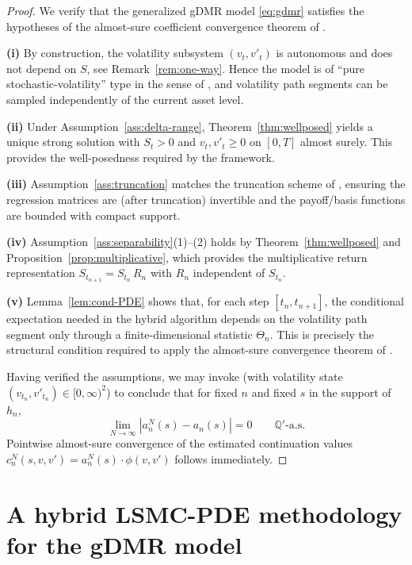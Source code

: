 \documentclass[10pt]{article}
\theoremstyle{plain}
\theoremstyle{definition}
\theoremstyle{remark}
\newcommand{\Q}{\mathbb Q}
\begin{document}
\begin{proof}
We verify that the generalized gDMR model \eqref{eq:gdmr} satisfies the hypotheses of the
almost-sure coefficient convergence theorem of \citet{farahany2020mixing}.

\smallskip
\textbf{(i)}
By construction, the volatility subsystem $(v_t,v'_t)$ is autonomous and does not depend on $S$,
see Remark~\ref{rem:one-way}. Hence the model is of ``pure stochastic-volatility'' type in the sense of
\citet{farahany2020mixing}, and volatility path segments can be sampled independently of the current asset level.

\smallskip
\textbf{(ii)}
Under Assumption~\ref{ass:delta-range}, Theorem~\ref{thm:wellposed} yields a unique strong solution with $S_t>0$
and $v_t,v'_t\ge 0$ on $[0,T]$ almost surely. This provides the well-posedness required by the framework.

\smallskip
\textbf{(iii)}
Assumption~\ref{ass:truncation} matches the truncation scheme of \citet{farahany2020mixing}, ensuring the regression
matrices are (after truncation) invertible and the payoff/basis functions are bounded with compact support.

\smallskip
\textbf{(iv)}
Assumption~\ref{ass:separability}(1)--(2) holds by Theorem~\ref{thm:wellposed} and Proposition~\ref{prop:multiplicative},
which provides the multiplicative return representation
$S_{t_{n+1}} = S_{t_n}\,R_n$ with $R_n$ independent of $S_{t_n}$.

\smallskip
\textbf{(v)}
Lemma~\ref{lem:cond-PDE} shows that, for each step $[t_n,t_{n+1}]$, the conditional expectation needed in the hybrid
algorithm depends on the volatility path segment only through a finite-dimensional statistic $\Theta_n$.
This is precisely the structural condition required to apply the almost-sure convergence theorem of
\citet{farahany2020mixing}.

\smallskip
Having verified the assumptions, we may invoke \citet[Theorem~1]{farahany2020mixing} (with volatility state
$(v_{t_n},v'_{t_n})\in[0,\infty)^2$) to conclude that for fixed $n$ and fixed $s$ in the support of $h_n$,
\[
\lim_{N\to\infty} |a_n^N(s)-a_n(s)| = 0
\qquad \Q'\text{-a.s.}
\]
Pointwise almost-sure convergence of the estimated continuation values
$c_n^N(s,v,v')=a_n^N(s)\cdot\phi(v,v')$ follows immediately.
\end{proof}




\section{A hybrid LSMC-PDE methodology for the gDMR model}\label{sec:methodology}
\end{document}
